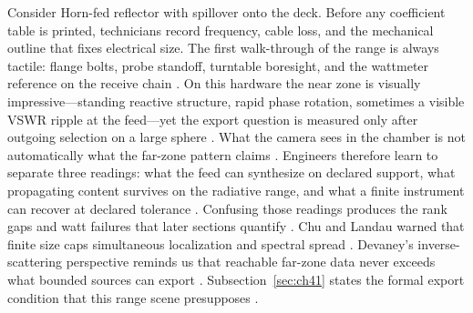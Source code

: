 \begin{physicalvignette}
Consider Horn-fed reflector with spillover onto the deck. Before any coefficient table is printed, technicians record frequency, cable loss, and the mechanical outline that fixes electrical size. The first walk-through of the range is always tactile: flange bolts, probe standoff, turntable boresight, and the wattmeter reference on the receive chain \cite{hansen1988}.
On this hardware the near zone is visually impressive---standing reactive structure, rapid phase rotation, sometimes a visible VSWR ripple at the feed---yet the export question is measured only after outgoing selection on a large sphere \cite{harrington2001}. What the camera sees in the chamber is not automatically what the far-zone pattern claims \cite{stratton1941}.
Engineers therefore learn to separate three readings: what the feed can synthesize on declared support, what propagating content survives on the radiative range, and what a finite instrument can recover at declared tolerance \cite{devaney2004}. Confusing those readings produces the rank gaps and watt failures that later sections quantify \cite{pal2026}.
Chu and Landau warned that finite size caps simultaneous localization and spectral spread \cite{chu1948}. Devaney's inverse-scattering perspective reminds us that reachable far-zone data never exceeds what bounded sources can export \cite{devaney2004}.
Subsection~\ref{sec:ch41} states the formal export condition that this range scene presupposes \cite{stratton1941}.
\end{physicalvignette}
